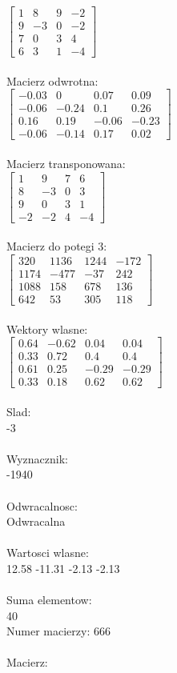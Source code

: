 \documentclass[a4paper,12pt]{article}
\begin{document}
$\begin{bmatrix} 1&8&9&-2\\9&-3&0&-2\\7&0&3&4\\6&3&1&-4 \end{bmatrix}$
\\
\\
Macierz odwrotna:\\

$\begin{bmatrix} -0.03&0&0.07&0.09\\-0.06&-0.24&0.1&0.26\\0.16&0.19&-0.06&-0.23\\-0.06&-0.14&0.17&0.02 \end{bmatrix}$
\\
\\
Macierz transponowana:\\

$\begin{bmatrix} 1&9&7&6\\8&-3&0&3\\9&0&3&1\\-2&-2&4&-4 \end{bmatrix}$
\\
\\
Macierz do potegi 3:\\

$\begin{bmatrix} 320&1136&1244&-172\\1174&-477&-37&242\\1088&158&678&136\\642&53&305&118 \end{bmatrix}$
\\
\\
Wektory wlasne:\\

$\begin{bmatrix} 0.64&-0.62&0.04&0.04\\0.33&0.72&0.4&0.4\\0.61&0.25&-0.29&-0.29\\0.33&0.18&0.62&0.62 \end{bmatrix}$
\\
\\
Slad:\\
-3
\\
\\
Wyznacznik:\\
-1940
\\
\\
Odwracalnosc:\\
Odwracalna
\\
\\
Wartosci wlasne:\\
12.58 -11.31 -2.13 -2.13
\\
\\
Suma elementow:\\
40
\\
\newpage
Numer macierzy:
666
\\
\\
Macierz:\\
\end{document}

